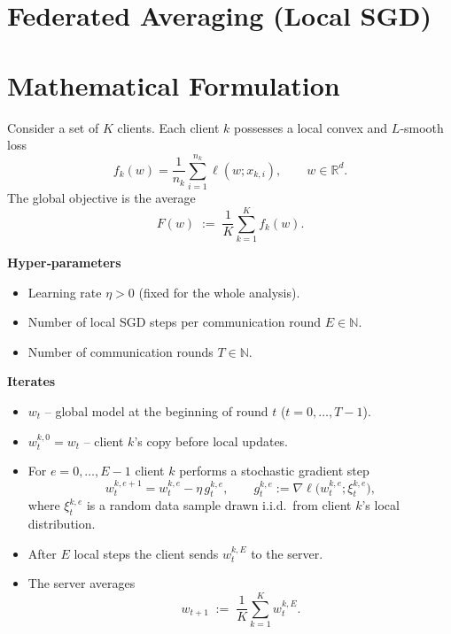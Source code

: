 \documentclass{article}
\newcommand{\R}{\mathbb{R}}
\newcommand{\grad}{\nabla}
\begin{document}
\section*{Federated Averaging (Local SGD)}

\section*{Mathematical Formulation}
Consider a set of $K$ clients.  
Each client $k$ possesses a local convex and $L$‑smooth loss 
\[
f_k(w)=\frac1{n_k}\sum_{i=1}^{n_k}\ell(w;x_{k,i}),\qquad w\in\R^d .
\]
The global objective is the average
\[
F(w)\;:=\;\frac1K\sum_{k=1}^{K}f_k(w).
\]

\bigskip
\noindent\textbf{Hyper‑parameters}
\begin{itemize}[nosep]
    \item Learning rate $\eta>0$ (fixed for the whole analysis).
    \item Number of local SGD steps per communication round $E\in\mathbb{N}$.
    \item Number of communication rounds $T\in\mathbb{N}$.
\end{itemize}

\bigskip
\noindent\textbf{Iterates}
\begin{itemize}[nosep]
    \item $w_t$ – global model at the beginning of round $t$ ($t=0,\dots,T-1$).
    \item $w_{t}^{k,0}=w_t$ – client $k$’s copy before local updates.
    \item For $e=0,\dots,E-1$ client $k$ performs a stochastic gradient step
    \[
    w_{t}^{k,e+1}=w_{t}^{k,e}-\eta\,g_{t}^{k,e},
    \qquad 
    g_{t}^{k,e}:=\grad\ell\bigl(w_{t}^{k,e};\xi_{t}^{k,e}\bigr),
    \]
    where $\xi_{t}^{k,e}$ is a random data sample drawn i.i.d.\ from client $k$’s local distribution.
    \item After $E$ local steps the client sends $w_{t}^{k,E}$ to the server.
    \item The server averages
    \[
    w_{t+1}\;:=\;\frac1K\sum_{k=1}^{K}w_{t}^{k,E}.
    \]
\end{itemize}
\end{document}

